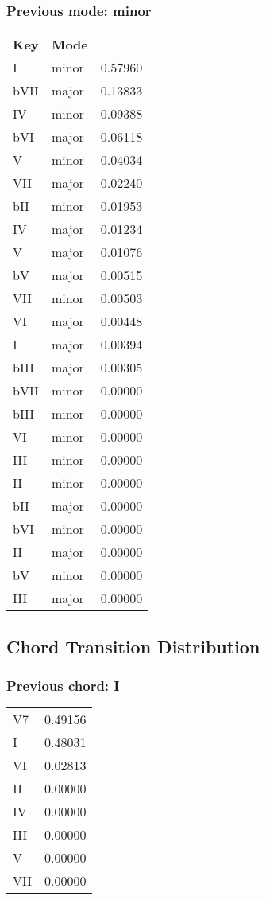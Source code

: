 \subsubsection*{Previous mode: minor}

\begin{tabular}{l l l}
\textbf{Key} & \textbf{Mode} \\
I & minor & 0.57960 \\
bVII & major & 0.13833 \\
IV & minor & 0.09388 \\
bVI & major & 0.06118 \\
V & minor & 0.04034 \\
VII & major & 0.02240 \\
bII & minor & 0.01953 \\
IV & major & 0.01234 \\
V & major & 0.01076 \\
bV & major & 0.00515 \\
VII & minor & 0.00503 \\
VI & major & 0.00448 \\
I & major & 0.00394 \\
bIII & major & 0.00305 \\
bVII & minor & 0.00000 \\
bIII & minor & 0.00000 \\
VI & minor & 0.00000 \\
III & minor & 0.00000 \\
II & minor & 0.00000 \\
bII & major & 0.00000 \\
bVI & minor & 0.00000 \\
II & major & 0.00000 \\
bV & minor & 0.00000 \\
III & major & 0.00000 \\
\end{tabular}

\subsection{Chord Transition Distribution}


\subsubsection*{Previous chord: I}


\begin{tabular}{l l}
V7 & 0.49156 \\
I & 0.48031 \\
VI & 0.02813 \\
II & 0.00000 \\
IV & 0.00000 \\
III & 0.00000 \\
V & 0.00000 \\
VII & 0.00000 \\
\end{tabular}


